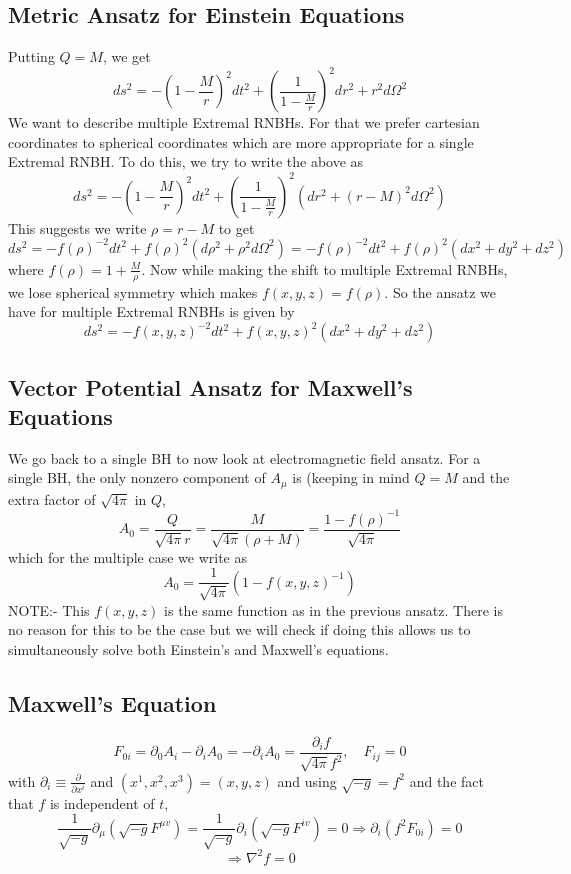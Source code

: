﻿\documentclass[12pt,a4paper]{article}
\begin{document}
\subsection{Metric Ansatz for Einstein Equations}
Putting $Q=M$, we get
$$
d s^{2}=-\left(1-\frac{M}{r}\right)^{2} d t^{2}+\left(\frac{1}{1-\frac{M}{r}}\right)^{2} d r^{2}+r^{2} d \Omega^{2}
$$
We want to describe multiple Extremal RNBHs. For that we prefer cartesian coordinates to spherical coordinates which are more appropriate for a single Extremal RNBH. To do this, we try to write the above as
$$
d s^{2}=-\left(1-\frac{M}{r}\right)^{2} d t^{2}+\left(\frac{1}{1-\frac{M}{r}}\right)^{2} \left(d r^{2}+(r-M)^{2} d \Omega^{2}\right)
$$
This suggests we write $\rho=r-M$ to get
$$
ds^{2}=-f(\rho)^{-2} d t^{2}+f(\rho)^{2}\left(d \rho^{2}+\rho^{2} d \Omega^{2}\right)=-f(\rho)^{-2} d t^{2}+f(\rho)^{2}\left(dx^{2}+dy^{2}+dz^{2}\right)
$$
where $f(\rho)=1+\frac{M}{\rho}$. Now while making the shift to multiple Extremal RNBHs, we lose spherical symmetry which makes $f(x,y,z)=f(\rho)$. So the ansatz we have for multiple Extremal RNBHs is given by
$$
d s^{2}=-f(x, y, z)^{-2} d t^{2}+f(x, y, z)^{2}\left(d x^{2}+d y^{2}+d z^{2}\right)
$$
\subsection{Vector Potential Ansatz for Maxwell's Equations}
We go back to a single BH to now look at electromagnetic field ansatz. For a single BH, the only nonzero component of $A_{\mu}$ is (keeping in mind $Q=M$ and the extra factor of $\sqrt{4 \pi}$ in $Q$,
$$A_{0}=\frac{Q}{\sqrt{4 \pi} r}=\frac{M}{\sqrt{4 \pi}(\rho+M)}=\frac{1-f(\rho)^{-1}}{\sqrt{4 \pi}}$$
which for the multiple case we write as 
$$
A_{0}=\frac{1}{\sqrt{4 \pi}}\left(1-f(x, y, z)^{-1}\right)
$$
NOTE:- This $f(x,y,z)$ is the same function as in the previous ansatz. There is no reason for this to be the case but we will check if doing this allows us to simultaneously solve both Einstein's and Maxwell's equations.

\subsection{Maxwell's Equation}
$$F_{0 i}=\partial_{0} A_{i}-\partial_{i} A_{0}=-\partial_{i} A_{0} =\frac{\partial_{i} f}{\sqrt{4 \pi}f^{2}},\quad F_{i j}=0$$
with $\partial_{i} \equiv \frac{\partial}{\partial x^{i}}$ and $\left(x^{1}, x^{2}, x^{3}\right)=(x, y, z)$ and using $\sqrt{-g}=f^{2}$ and the fact that $f$ is independent of $t$,
$$\frac{1}{\sqrt{-g}} \partial_{\mu}\left(\sqrt{-g} F^{\mu v}\right)=\frac{1}{\sqrt{-g}} \partial_{i}\left(\sqrt{-g} F^{i v}\right)=0 \Rightarrow \partial_{i}\left(f^{2} F_{0 i}\right)=0$$
$$ \Rightarrow  \nabla^{2} f=0$$
\end{document}
